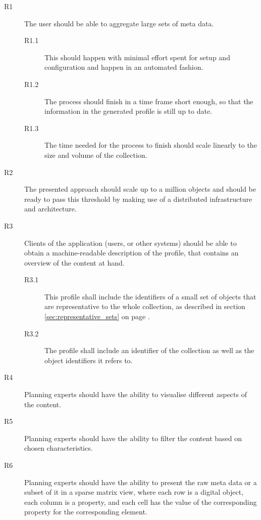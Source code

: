 \begin{description}
\item[R1] The user should be able to aggregate large sets of meta data.
\begin{description}
\item[R1.1] This should happen with minimal effort spent for setup and configuration and happen in an automated fashion.
\item[R1.2] The process should finish in a time frame short enough, so that the information in the generated profile is
still up to date.
\item[R1.3] The time needed for the process to finish should scale linearly to the size and volume of the collection.
\end{description}
\item[R2] The presented approach should scale up to a million objects and should be ready to pass this threshold by making use of a distributed infrastructure and architecture.
\item[R3] Clients of the application (users, or other systems) should be able to obtain a machine-readable description of the profile, that contains an overview of the content at hand.
\begin{description}
\item[R3.1] This profile shall include the identifiers of a small set of objects that are representative to the whole collection, as described in section \ref{sec:representative_sets} on page \pageref{sec:representative_sets}.
\item[R3.2] The profile shall include an identifier of the collection as well as the object identifiers it refers to.
\end{description}
\item[R4] Planning experts should have the ability to visualise different aspects of the content.
\item[R5] Planning experts should have the ability to filter the content based on chosen characteristics.
\item[R6] Planning experts should have the ability to present the raw meta data or a subset of it in a sparse matrix view, where each row is a digital object, each column is a property, and each cell has the value of the corresponding property for the corresponding element.
\end{description}


